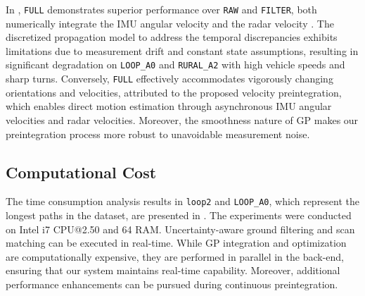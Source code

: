 In ,
\texttt{FULL} demonstrates superior performance over \texttt{RAW} and \texttt{FILTER}, both numerically integrate the \ac{IMU} angular velocity and the radar velocity \cite{kubelka2024do}. 
The discretized propagation model to address the temporal discrepancies exhibits limitations due to measurement drift and constant state assumptions, resulting in significant degradation on \texttt{LOOP\_A0} and \texttt{RURAL\_A2} with high vehicle speeds and sharp turns.
Conversely, \texttt{FULL} effectively accommodates vigorously changing orientations and velocities, attributed to the proposed velocity preintegration, which enables direct motion estimation through asynchronous \ac{IMU} angular velocities and radar velocities.
Moreover, the smoothness nature of \ac{GP} makes our preintegration process more robust to unavoidable measurement noise.



\subsection{Computational Cost}
\label{subsec:timecost}

The time consumption analysis results in \texttt{loop2} and \texttt{LOOP\_A0}, which represent the longest paths in the dataset, are presented in . The experiments were conducted on Intel i7 CPU@2.50 {\GHz} and 64 {\GB} RAM.
Uncertainty-aware ground filtering and scan matching can be executed in real-time. While \ac{GP} integration and optimization are computationally expensive, they are performed in parallel in the back-end, ensuring that our system maintains real-time capability. Moreover, additional performance enhancements can be pursued during continuous preintegration.
